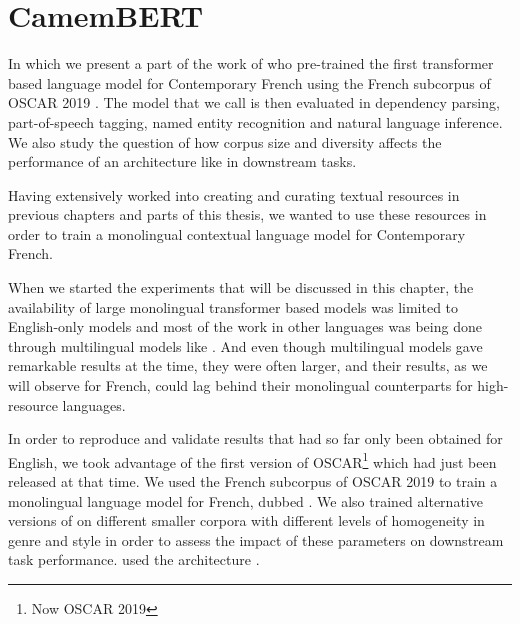 \chapter{CamemBERT}

\begin{center}
    \begin{minipage}{0.66\textwidth}
        \begin{small}
            In which we present a part of the work of \citet{martin-etal-2020-camembert} who pre-trained the first transformer based language model for Contemporary French using the French subcorpus of OSCAR 2019 \citep{ortiz-suarez-etal-2019-asynchronous,ortiz-suarez-etal-2020-monolingual}. The model that we call \camembert is then evaluated in dependency parsing, part-of-speech tagging, named entity recognition and natural language inference. We also study the question of how corpus size and diversity affects the performance of an architecture like \roberta \citep{liu-etal-2019-roberta} in downstream tasks.
        \end{small}
    \end{minipage}
    \vspace{0.5cm}
\end{center}

Having extensively worked into creating and curating textual resources in previous chapters and parts of this thesis, we wanted to use these resources in order to train a monolingual contextual language model for Contemporary French.

When we started the experiments that will be discussed in this chapter, the availability of large monolingual transformer based models was limited to English-only models \citep{devlin-etal-2019-bert,radford-etal-2019-language,liu-etal-2019-roberta,yang-etal-2019-xlnet,raffel-etal-2020-exploring} and most of the work in other languages was being done through multilingual models like \mbert \citep{devlin-etal-2019-bert}. And even though multilingual models gave remarkable results at the time, they were often larger, and their results, as we will observe for French, could lag behind their monolingual counterparts for high-resource languages.

In order to reproduce and validate results that had so far only been obtained for English, we took advantage of the first version of OSCAR\footnote{Now OSCAR 2019} \citep{ortiz-suarez-etal-2019-asynchronous} which had just been released at that time. We used the French subcorpus of OSCAR 2019 to train a monolingual language model for French, dubbed \camembert. We also trained alternative versions of \camembert on different smaller corpora with different levels of homogeneity in genre and style in order to assess the impact of these parameters on downstream task performance.
\camembert used the \roberta architecture \citep{liu-etal-2019-roberta}.

